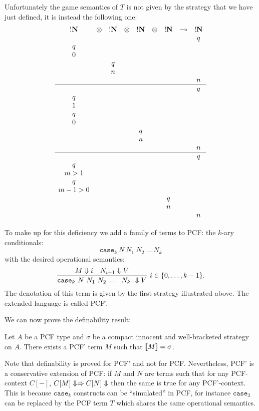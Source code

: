 Unfortunately the game semantics of $T$ is not given by the strategy that we have just defined, it is instead the following one:
$$
\begin{array}{ccccccccc}
!\bf N & \otimes & !\bf N & \otimes & !\bf N & \otimes & !\bf N & \multimap & !\bf N \\
&&&&&&&&q \\
q \\
0 \\
&& q \\
&& n \\
&&&&&&&&n \\
\hline
&&&&&&&&q \\
q \\
1 \\
q \\
0 \\
&&&& q \\
&&&& n \\
&&&&&&&&n \\
\hline
&&&&&&&&q \\
q \\
m>1 \\
q \\
m-1>0 \\
&&&&&& q \\
&&&&&& n \\
&&&&&&&&n \\
\end{array}
$$

To make up for this deficiency we add a family of terms to PCF: the $k$-ary conditionals:
$$ \texttt{case}_k\ N\ N_1\ N_2\ \ldots\ N_k$$
with the desired operational semantics:
$$ \frac{\displaystyle M \Downarrow i \quad N_{i+1} \Downarrow V}{\texttt{case}_k\ N\ N_1\ N_2\ \ldots\ N_k\ \Downarrow V}\ i \in \{0, \ldots,k-1\}.$$
The denotation of this term is given by the first strategy illustrated above.
The extended language is called PCF'.

We can now prove the definability result:
\begin{prop}[Definability]
\label{prop:definability} Let $A$ be a PCF type and $\sigma$ be a compact innocent and well-bracketed
strategy on $A$. There exists a PCF' term $M$ such that ${[\![ M ]\!]} = \sigma$.
\end{prop}

Note that definability is proved for PCF' and not for PCF.
Nevertheless, PCF' is a conservative extension of PCF: if $M$ and $N$ are terms such that for any PCF-context $C[-]$,
$C[M] \Downarrow \Rightarrow C[N] \Downarrow$ then the same is true for any PCF'-context. This is because $\texttt{case}_k$ constructs can be ``simulated''
in PCF, for instance $\texttt{case}_3$ can be replaced by the PCF term $T$ which shares the same operational semantics.

